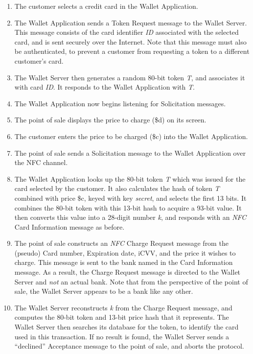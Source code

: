 \begin{enumerate}
\item The customer selects a credit card in the Wallet Application.
\item The Wallet Application sends a Token Request message to the Wallet Server.
    This message consists of the card identifier \emph{ID} associated with the selected card, and is sent securely over the Internet.
    Note that this message must also be authenticated, to prevent a customer from requesting a token to a different customer's card.
\item The Wallet Server then generates a random 80-bit token \emph{T}, and associates it with card \emph{ID}.
    It responds to the Wallet Application with \emph{T}.
\item The Wallet Application now begins listening for Solicitation messages.
\item The point of sale displays the price to charge (\$d) on its screen.
\item The customer enters the price to be charged (\$c) into the Wallet Application.
\item The point of sale sends a Solicitation message to the Wallet Application over the NFC channel.
\item The Wallet Application looks up the 80-bit token \emph{T} which was issued for the card selected by the customer.
    It also calculates the hash of token \emph{T} combined with price \$c, keyed with key \emph{secret}, and selects the first 13 bits.
    It combines the 80-bit token with this 13-bit hash to acquire a 93-bit value.
    It then converts this value into a 28-digit number \emph{k}, and responds with an \emph{NFC} Card Information message as before.
\item The point of sale constructs an \emph{NFC} Charge Request message from the (pseudo) Card number, Expiration date, iCVV, and the price it wishes to charge.
    This message is sent to the bank named in the Card Information message.
    As a result, the Charge Request message is directed to the Wallet Server and \emph{not} an actual bank.
    Note that from the perspective of the point of sale, the Wallet Server appears to be a bank like any other.
\item The Wallet Server reconstructs \emph{k} from the Charge Request message, and computes the 80-bit token and 13-bit price hash that it represents.
    The Wallet Server then searches its database for the token, to identify the card used in this transaction.
    If no result is found, the Wallet Server sends a ``declined'' Acceptance message to the point of sale, and aborts the protocol.

\end{enumerate}
